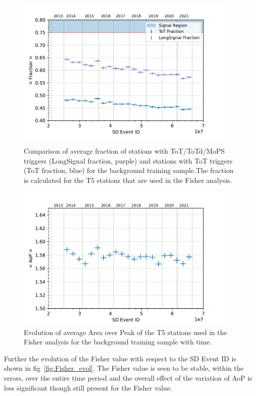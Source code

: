 \begin{figure}[t!]
  \centering
  \includegraphics[width=0.95\textwidth]{thesis_figures/Nu_analysis/Time_evol/Selection_Evo_ToTFrac_LongSignal_wnt_redcut.pdf}
  \caption{Comparison of average fraction of stations with ToT/ToTd/MoPS triggers (LongSignal fraction, purple) and stations with ToT triggers (ToT fraction, blue) for the background training sample.The fraction is calculated for the T5 stations that are used in the Fisher analysis.}
  \label{fig:LongSig_evol}

  \includegraphics[width=0.95\textwidth]{thesis_figures/Nu_analysis/Time_evol/Selection_Evo_AoP_wnt_redcut.pdf}
  \caption{Evolution of average Area over Peak of the T5 stations used in the Fisher analysis for the background training sample with time.}
  \label{fig:AoP_evol}
\end{figure}

Further the evolution of the Fisher value with respect to the SD Event ID is shown in fig~\ref{fig:Fisher_evol}. The Fisher value is seen to be stable, within the errors, over the entire time period and the overall effect of the variation of AoP is less significant though still present for the Fisher value.

